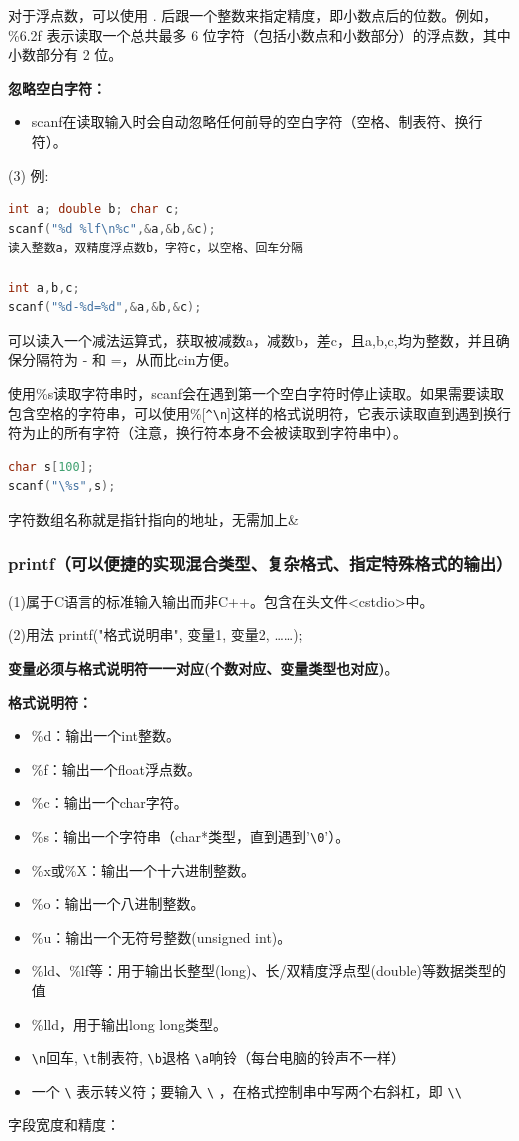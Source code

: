\documentclass[UTF8]{ctexart}
\begin{document}
对于浮点数，可以使用 . 后跟一个整数来指定精度，即小数点后的位数。例如，\%6.2f 表示读取一个总共最多 6 位字符（包括小数点和小数部分）的浮点数，其中小数部分有 2 位。

\textbf{忽略空白字符：}
\begin{itemize}
    \item scanf在读取输入时会自动忽略任何前导的空白字符（空格、制表符、换行符）。
\end{itemize}
(3) 例:
\begin{lstlisting}[language = C,basicstyle=\small\ttfamily]
int a; double b; char c;
scanf("%d %lf\n%c",&a,&b,&c);
读入整数a，双精度浮点数b，字符c，以空格、回车分隔

int a,b,c;
scanf("%d-%d=%d",&a,&b,&c);
\end{lstlisting}
可以读入一个减法运算式，获取被减数a，减数b，差c，且a,b,c,均为整数，并且确保分隔符为 - 和 =，从而比cin方便。

使用\%s读取字符串时，scanf会在遇到第一个空白字符时停止读取。如果需要读取包含空格的字符串，可以使用\%[\verb|^\n|]这样的格式说明符，它表示读取直到遇到换行符为止的所有字符（注意，换行符本身不会被读取到字符串中）。
\begin{lstlisting}[language = C,basicstyle=\small\ttfamily]
char s[100];
scanf("\%s",s); 
\end{lstlisting}
字符数组名称就是指针指向的地址，无需加上\&
\subsubsection{printf（可以便捷的实现混合类型、复杂格式、指定特殊格式的输出）}
(1)属于C语言的标准输入输出而非C++。包含在头文件<cstdio>中。

(2)用法 printf("格式说明串", 变量1, 变量2, ……);

\textbf{变量必须与格式说明符一一对应(个数对应、变量类型也对应)}。

\textbf{格式说明符：}
\begin{itemize}
    \item \%d：输出一个int整数。
    \item \%f：输出一个float浮点数。
    \item \%c：输出一个char字符。
    \item \%s：输出一个字符串（char*类型，直到遇到'\verb|\0|'）。
    \item \%x或\%X：输出一个十六进制整数。
    \item \%o：输出一个八进制整数。
    \item \%u：输出一个无符号整数(unsigned int)。
    \item \%ld、\%lf等：用于输出长整型(long)、长/双精度浮点型(double)等数据类型的值
    \item \%lld，用于输出long long类型。
    \item \verb|\n|回车, \verb|\t|制表符, \verb|\b|退格 \verb|\a|响铃（每台电脑的铃声不一样）
    \item 一个 \verb|\| 表示转义符；要输入 \verb|\| ，在格式控制串中写两个右斜杠，即 \verb|\\| 
\end{itemize}
字段宽度和精度：
\end{document}
